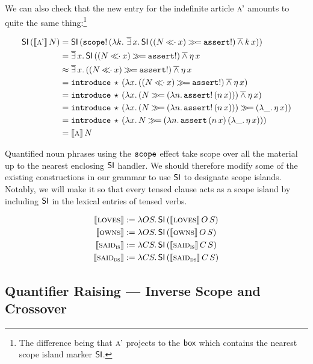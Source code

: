 We can also check that the new entry for the indefinite article $\textsc{a'}$
amounts to quite the same thing:\footnote{The difference being that
  $\textsc{a'}$ projects to the $\textsf{box}$ which contains the nearest scope island
  marker $\textsf{SI}$.}

\begin{align*}
\ap{\SI}{(\ap{\sem{\abs{a'}}}{N})}
&= \ap{\SI}{(\ap{\op{scope}!}{(\lam{k}{\dexists x.\,\ap{\SI}{((N \apl x) \hsbind \op{assert}!)} \dand \ap{k}{x}})})} \\
&= \dexists x.\,\ap{\SI}{((N \apl x) \hsbind \op{assert}!)} \dand \etaE{x} \\
&\approx \dexists x.\,((N \apl x) \hsbind \op{assert}!) \dand \etaE{x} \\
&= \app{\op{introduce}}{\star}{(\lam{x}{((N \apl x) \hsbind \op{assert}!) \dand \etaE{x}})} \\
&= \app{\op{introduce}}{\star}{(\lam{x}{(N \hsbind (\lam{n}{\ap{\op{assert}!}{(\ap{n}{x})}})) \dand \etaE{x}})} \\
&= \app{\op{introduce}}{\star}{(\lam{x}{(N \hsbind (\lam{n}{\ap{\op{assert}!}{(\ap{n}{x})}})) \hsbind (\lam{\_}{\etaE{x}})})} \\
&= \app{\op{introduce}}{\star}{(\lam{x}{N \hsbind (\lam{n}{\app{\op{assert}}{(\ap{n}{x})}{(\lam{\_}{\etaE{x}})}})})} \\
&= \ap{\sem{\abs{a}}}{N}
\end{align*}

Quantified noun phrases using the $\mathtt{scope}$ effect take scope over
all the material up to the nearest enclosing $\textsf{SI}$ handler. We should
therefore modify some of the existing constructions in our grammar to use
$\textsf{SI}$ to designate scope islands. Notably, we will make it so that every
tensed clause acts as a scope island by including $\textsf{SI}$ in the lexical
entries of tensed verbs.

\begin{align*}
  \llbracket \textsc{loves} \rrbracket &:= \lambda O S.\, \textsf{SI}\,(\llbracket \textsc{loves} \rrbracket\,O\,S) \\
  \llbracket \textsc{owns} \rrbracket &:= \lambda O S.\, \textsf{SI}\,(\llbracket \textsc{owns} \rrbracket\,O\,S) \\
  \llbracket \textsc{said}_{\textsc{is}} \rrbracket &:= \lambda C S.\, \textsf{SI}\,(\llbracket \textsc{said}_{\textsc{is}} \rrbracket\,C\,S) \\
  \llbracket \textsc{said}_{\textsc{ds}} \rrbracket &:= \lambda C S.\, \textsf{SI}\,(\llbracket \textsc{said}_{\textsc{ds}} \rrbracket\,C\,S)
\end{align*}


\subsection{Quantifier Raising --- Inverse Scope and Crossover}
\label{ssec:crossover}

